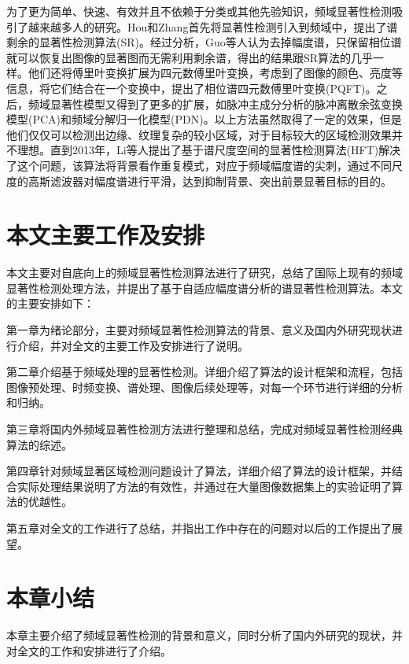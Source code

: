 为了更为简单、快速、有效并且不依赖于分类或其他先验知识，频域显著性检测吸引了越来越多人的研究。Hou和Zhang首先将显著性检测引入到频域中，提出了谱剩余的显著性检测算法(SR)\cite{HouXiaodiCVPR2007Residual}。经过分析，Guo等人\cite{GuoChenleiCVPR2008Spatio}认为去掉幅度谱，只保留相位谱就可以恢复出图像的显著图而无需利用剩余谱，得出的结果跟SR算法的几乎一样。他们还将傅里叶变换扩展为四元数傅里叶变换，考虑到了图像的颜色、亮度等信息，将它们结合在一个变换中，提出了相位谱四元数傅里叶变换(PQFT)。之后，频域显著性模型又得到了更多的扩展，如脉冲主成分分析的脉冲离散余弦变换模型(PCA)\cite{YuICDL2009Spatio}和频域分解归一化模型(PDN)\cite{BianCognNeurodyn2010Visual}。以上方法虽然取得了一定的效果，但是他们仅仅可以检测出边缘、纹理复杂的较小区域，对于目标较大的区域检测效果并不理想。直到2013年，Li等人提出了基于谱尺度空间的显著性检测算法(HFT)\cite{LiJianTPAMI2013Scale}解决了这个问题，该算法将背景看作重复模式，对应于频域幅度谱的尖刺，通过不同尺度的高斯滤波器对幅度谱进行平滑，达到抑制背景、突出前景显著目标的目的。

\section{本文主要工作及安排}
\label{1_3}

本文主要对自底向上的频域显著性检测算法进行了研究，总结了国际上现有的频域显著性检测处理方法，并提出了基于自适应幅度谱分析的谱显著性检测算法。本文的主要安排如下：

第一章为绪论部分，主要对频域显著性检测算法的背景、意义及国内外研究现状进行介绍，并对全文的主要工作及安排进行了说明。

第二章介绍基于频域处理的显著性检测。详细介绍了算法的设计框架和流程，包括图像预处理、时频变换、谱处理、图像后续处理等，对每一个环节进行详细的分析和归纳。

第三章将国内外频域显著性检测方法进行整理和总结，完成对频域显著性检测经典算法的综述。

第四章针对频域显著区域检测问题设计了算法，详细介绍了算法的设计框架，并结合实际处理结果说明了方法的有效性，并通过在大量图像数据集上的实验证明了算法的优越性。

第五章对全文的工作进行了总结，并指出工作中存在的问题对以后的工作提出了展望。

\section{本章小结}
\label{1_4}

本章主要介绍了频域显著性检测的背景和意义，同时分析了国内外研究的现状，并对全文的工作和安排进行了介绍。

